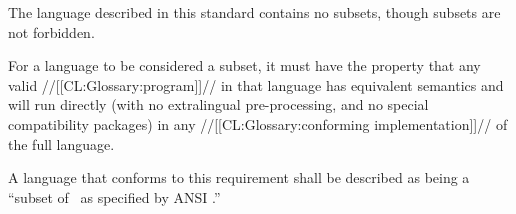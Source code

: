 


The language described in this standard contains no subsets,
though subsets are not forbidden.


For a language to be considered a subset,
it must have the property that any valid //[[CL:Glossary:program]]// in that language
has equivalent semantics and will run directly
(with no extralingual pre-processing, and no special compatibility packages)
in any //[[CL:Glossary:conforming implementation]]// of the full language.

A language that conforms to this requirement shall be described
as being a ``subset of \clisp\ as specified by ANSI .''
